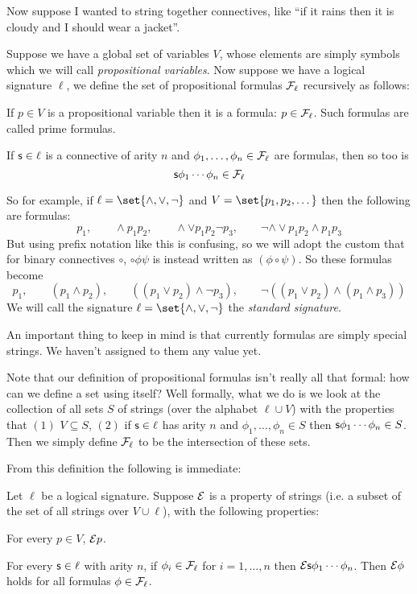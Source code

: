 Now suppose I wanted to string together connectives, like ``if it rains then it is cloudy and I
should wear a jacket''.

\bdefn

    Suppose we have a global set of variables $V$, whose elements are simply symbols which we will
    call {\it propositional variables}.
    Now suppose we have a logical signature $\ell$, we define the set of
    {\emphcolor propositional formulas} ${\cal F}_\ell$ recursively as follows:
    \benum
        \item If $p\in V$ is a propositional variable then it is a formula: $p\in{\cal F}_\ell$.
        Such formulas are called {\emphcolor prime formulas}.
        \item If ${\sf s}\in\ell$ is a connective of arity $n$ and
        $\phi_1,\dots,\phi_n\in{\cal F}_\ell$ are formulas, then so too is
        $$ {\sf s}\phi_1\cdots\phi_n\in{\cal F}_\ell $$
    \eenum

\edefn

So for example, if $\ell=\set{\land,\lor,\neg}$ and $V=\set{p_1,p_2,\dots}$ then the following are
formulas:
$$ p_1, \qquad {\land} p_1p_2, \qquad {\land}{\lor} p_1p_2\neg p_3, \qquad
\neg{\land}{\lor} p_1p_2{\land} p_1p_3 $$
But using prefix notation like this is confusing, so we will adopt the custom that for binary
connectives $\circ$, $\circ\phi\psi$ is instead written as $(\phi\circ\psi)$.
So these formulas become
$$ p_1, \qquad (p_1\land p_2), \qquad ((p_1\lor p_2)\land\neg p_3),
\qquad \neg((p_1\lor p_2)\land(p_1\land p_3)) $$
We will call the signature $\ell=\set{{\land},{\lor},{\neg}}$ the {\it standard signature}.

An important thing to keep in mind is that currently formulas are simply special strings.
We haven't assigned to them any value yet.

Note that our definition of propositional formulas isn't really all that formal: how can we define
a set using itself?
Well formally, what we do is we look at the collection of all sets $S$ of strings (over the
alphabet $\ell\cup V$) with the properties that $(1)$ $V\subseteq S$, $(2)$ if ${\sf s}\in\ell$ has
arity $n$ and $\phi_1,\dots,\phi_n\in S$ then ${\sf s}\phi_1\cdots\phi_n\in S$.
Then we simply define ${\cal F}_\ell$ to be the intersection of these sets.

From this definition the following is immediate:

\blemm[title=The Principle of Formula Induction]

    Let $\ell$ be a logical signature.
    Suppose ${\cal E}$ is a property of strings (i.e. a subset of the set of all strings over
    $V\cup\ell$), with the following properties:
    \benum
        \item For every $p\in V$, ${\cal E}p$.
        \item For every ${\sf s}\in\ell$ with arity $n$, if $\phi_i\in{\cal F}_\ell$ for
        $i=1,\dots,n$ then ${\cal E}{\sf s}\phi_1\cdots\phi_n$.
    \eenum
    Then ${\cal E}\phi$ holds for all formulas $\phi\in{\cal F}_\ell$.

